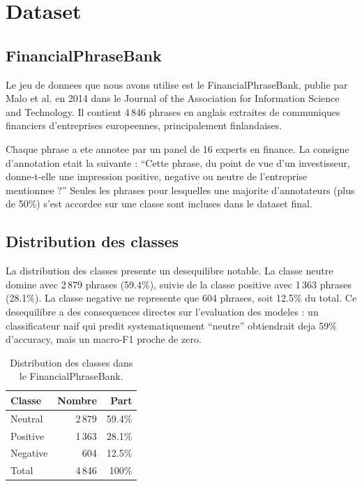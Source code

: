 \documentclass[12pt, a4paper]{article}
\begin{document}
\section{Dataset}

\subsection{FinancialPhraseBank}

Le jeu de donnees que nous avons utilise est le FinancialPhraseBank, publie par
Malo et al. en 2014 dans le Journal of the Association for Information Science and
Technology. Il contient 4\,846 phrases en anglais extraites de communiques financiers
d'entreprises europeennes, principalement finlandaises.

Chaque phrase a ete annotee par un panel de 16 experts en finance. La consigne
d'annotation etait la suivante : ``Cette phrase, du point de vue d'un investisseur,
donne-t-elle une impression positive, negative ou neutre de l'entreprise mentionnee ?''
Seules les phrases pour lesquelles une majorite d'annotateurs (plus de 50\%) s'est
accordee sur une classe sont incluses dans le dataset final.

\subsection{Distribution des classes}

La distribution des classes presente un desequilibre notable. La classe neutre domine
avec 2\,879 phrases (59.4\%), suivie de la classe positive avec 1\,363 phrases (28.1\%).
La classe negative ne represente que 604 phrases, soit 12.5\% du total. Ce desequilibre
a des consequences directes sur l'evaluation des modeles : un classificateur naif qui
predit systematiquement ``neutre'' obtiendrait deja 59\% d'accuracy, mais un macro-F1
proche de zero.

\begin{table}[h]
  \centering
  \begin{tabular}{lrr}
    \toprule
    Classe   & Nombre & Part \\
    \midrule
    Neutral  & 2\,879 & 59.4\% \\
    Positive & 1\,363 & 28.1\% \\
    Negative &    604 & 12.5\% \\
    \midrule
    Total    & 4\,846 & 100\% \\
    \bottomrule
  \end{tabular}
  \caption{Distribution des classes dans le FinancialPhraseBank.}
\end{table}
\end{document}
